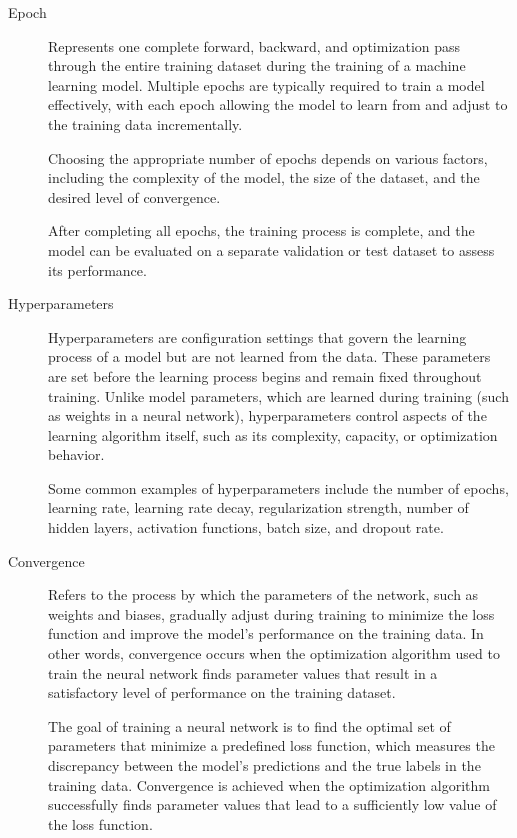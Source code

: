 \documentclass[a4paper]{article}
\begin{document}
\begin{description}
\item[Epoch] 
Represents one complete forward, backward, and optimization pass through the entire training dataset during the training of a machine learning model. Multiple epochs are typically required to train a model effectively, with each epoch allowing the model to learn from and adjust to the training data incrementally.

Choosing the appropriate number of epochs depends on various factors, including the complexity of the model, the size of the dataset, and the desired level of convergence. 

After completing all epochs, the training process is complete, and the model can be evaluated on a separate validation or test dataset to assess its performance.

\item[Hyperparameters]
Hyperparameters are configuration settings that govern the learning process of a model but are not learned from the data. These parameters are set before the learning process begins and remain fixed throughout training. Unlike model parameters, which are learned during training (such as weights in a neural network), hyperparameters control aspects of the learning algorithm itself, such as its complexity, capacity, or optimization behavior.

Some common examples of hyperparameters include the number of epochs, learning rate, learning rate decay, regularization strength, number of hidden layers, activation functions, batch size, and dropout rate.

\item[Convergence]
Refers to the process by which the parameters of the network, such as weights and biases, gradually adjust during training to minimize the loss function and improve the model's performance on the training data. In other words, convergence occurs when the optimization algorithm used to train the neural network finds parameter values that result in a satisfactory level of performance on the training dataset.

The goal of training a neural network is to find the optimal set of parameters that minimize a predefined loss function, which measures the discrepancy between the model's predictions and the true labels in the training data. Convergence is achieved when the optimization algorithm successfully finds parameter values that lead to a sufficiently low value of the loss function.


\end{description}
\end{document}
